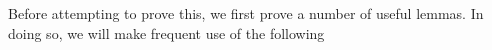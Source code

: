 
Before attempting to prove this, we first prove a number of useful lemmas. 
In doing so, we will make frequent use of the following

